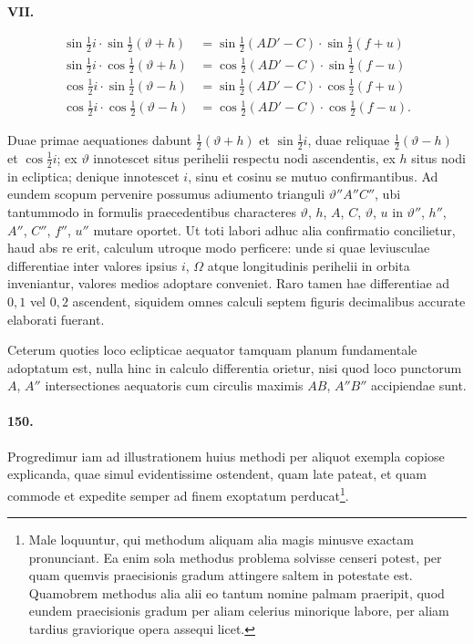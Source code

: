 \documentclass[12pt,a4paper]{article}
\begin{document}
\begin{center}
\textbf{VII.}
\end{center}
\begin{align*}
\sin\tfrac{1}{2}i \cdot \sin\tfrac{1}{2}(\vartheta + h) &= \sin\tfrac{1}{2}(AD' - C) \cdot \sin\tfrac{1}{2}(f + u)\\
\sin\tfrac{1}{2}i \cdot \cos\tfrac{1}{2}(\vartheta + h) &= \cos\tfrac{1}{2}(AD' - C) \cdot \sin\tfrac{1}{2}(f - u)\\
\cos\tfrac{1}{2}i \cdot \sin\tfrac{1}{2}(\vartheta - h) &= \sin\tfrac{1}{2}(AD' - C) \cdot \cos\tfrac{1}{2}(f + u)\\
\cos\tfrac{1}{2}i \cdot \cos\tfrac{1}{2}(\vartheta - h) &= \cos\tfrac{1}{2}(AD' - C) \cdot \cos\tfrac{1}{2}(f - u).
\end{align*}

Duae primae aequationes dabunt $\tfrac{1}{2}(\vartheta + h)$ et $\sin\tfrac{1}{2}i$, duae reliquae $\tfrac{1}{2}(\vartheta - h)$ et $\cos\tfrac{1}{2}i$; ex $\vartheta$ innotescet situs perihelii respectu nodi ascendentis, ex $h$ situs nodi in ecliptica; denique innotescet $i$, sinu et cosinu se mutuo confirmantibus. Ad eundem scopum pervenire possumus adiumento trianguli $\vartheta'' A''C''$, ubi tantummodo in formulis praecedentibus characteres $\vartheta$, $h$, $A$, $C$, $\vartheta$, $u$ in $\vartheta''$, $h''$, $A''$, $C''$, $f''$, $u''$ mutare oportet. Ut toti labori adhuc alia confirmatio concilietur, haud abs re erit, calculum utroque modo perficere: unde si quae leviusculae differentiae inter valores ipsius $i$, $\Omega$ atque longitudinis perihelii in orbita inveniantur, valores medios adoptare conveniet. Raro tamen hae differentiae ad $0,1$ vel $0,2$ ascendent, siquidem omnes calculi septem figuris decimalibus accurate elaborati fuerant.

Ceterum quoties loco eclipticae aequator tamquam planum fundamentale adoptatum est, nulla hinc in calculo differentia orietur, nisi quod loco punctorum $A$, $A''$ intersectiones aequatoris cum circulis maximis $AB$, $A''B''$ accipiendae sunt.

\paragraph{150.}
Progredimur iam ad illustrationem huius methodi per aliquot exempla copiose explicanda, quae simul evidentissime ostendent, quam late pateat, et quam commode et expedite semper ad finem exoptatum perducat\footnote{Male loquuntur, qui methodum aliquam alia magis minusve exactam pronunciant. Ea enim sola methodus problema solvisse censeri potest, per quam quemvis praecisionis gradum attingere saltem in potestate est. Quamobrem methodus alia alii eo tantum nomine palmam praeripit, quod eundem praecisionis gradum per aliam celerius minorique labore, per aliam tardius graviorique opera assequi licet.}.
\end{document}

